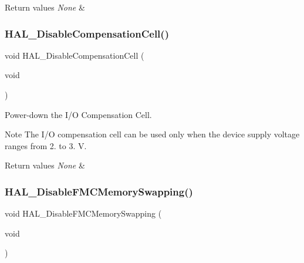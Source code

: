 \begin{DoxyRetVals}{Return values}
{\em None} & \\
\hline
\end{DoxyRetVals}
\mbox{\label{group___h_a_l___exported___functions___group2_ga653f1166b0e37afd40372550d806e667}} 
\subsubsection{\texorpdfstring{HAL\_DisableCompensationCell()}{HAL\_DisableCompensationCell()}}
{\footnotesize\ttfamily void H\+A\+L\+\_\+\+Disable\+Compensation\+Cell (\begin{DoxyParamCaption}\item[{void}]{ }\end{DoxyParamCaption})}



Power-\/down the I/O Compensation Cell. 

\begin{DoxyNote}{Note}
The I/O compensation cell can be used only when the device supply voltage ranges from 2. to 3. V.
\end{DoxyNote}

\begin{DoxyRetVals}{Return values}
{\em None} & \\
\hline
\end{DoxyRetVals}
\mbox{\label{group___h_a_l___exported___functions___group2_ga0863e6c3b386823ab0f5af6dd5121c32}} 
\subsubsection{\texorpdfstring{HAL\_DisableFMCMemorySwapping()}{HAL\_DisableFMCMemorySwapping()}}
{\footnotesize\ttfamily void H\+A\+L\+\_\+\+Disable\+F\+M\+C\+Memory\+Swapping (\begin{DoxyParamCaption}\item[{void}]{ }\end{DoxyParamCaption})}



